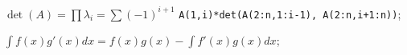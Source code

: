 
\entry
$\det(A) = \prod \lambda_i = \sum (-1)^{i+1}$ \texttt{A(1,i)*det(A(2:n,1:i-1), A(2:n,i+1:n))};

\entry
$\int f(x)g'(x)dx = f(x)g(x) - \int f'(x)g(x)dx$;
